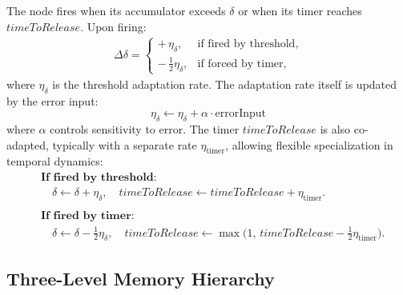 \documentclass[11pt]{article}
\begin{document}
The node fires when its accumulator exceeds \(\delta\) or when its timer reaches \(timeToRelease\). Upon firing:
\begin{align}
\Delta \delta =
\begin{cases}
+\,\eta_{\delta}, & \text{if fired by threshold}, \\
-\,\frac{1}{2}\eta_{\delta}, & \text{if forced by timer,}
\end{cases}
\end{align}
where \(\eta_{\delta}\) is the threshold adaptation rate.  
The adaptation rate itself is updated by the error input:
\begin{equation}
\eta_{\delta} \leftarrow \eta_{\delta} + \alpha \cdot \text{errorInput}
\end{equation}
where \(\alpha\) controls sensitivity to error. The timer \(timeToRelease\) is also co-adapted, typically with a separate rate \(\eta_{\text{timer}}\), allowing flexible specialization in temporal dynamics:
\[
\begin{aligned}
&\textbf{If fired by threshold:}\\
&\quad \delta \leftarrow \delta + \eta_{\delta},\quad
timeToRelease \leftarrow timeToRelease + \eta_{\text{timer}}.\\
\\
&\textbf{If fired by timer:}\\
&\quad \delta \leftarrow \delta - \tfrac{1}{2}\eta_{\delta},\quad
timeToRelease \leftarrow \max\bigl(1,\, timeToRelease - \tfrac{1}{2}\eta_{\text{timer}}\bigr).
\end{aligned}
\]

\subsection{Three-Level Memory Hierarchy}
\end{document}
